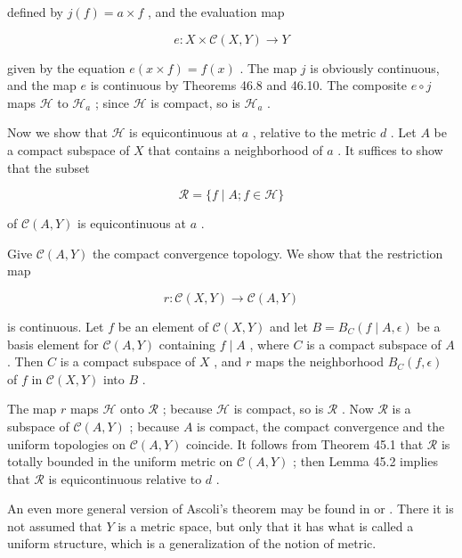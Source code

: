 defined by \(j\left( f\right)  = a \times  f\) , and the evaluation map

\[
e : X \times  \mathcal{C}\left( {X,Y}\right)  \rightarrow  Y
\]

given by the equation \(e\left( {x \times  f}\right)  = f\left( x\right)\) . The map \(j\) is obviously continuous, and the map \(e\) is continuous by Theorems 46.8 and 46.10. The composite \(e \circ  j\) maps \(\mathcal{H}\) to \({\mathcal{H}}_{a}\) ; since \(\mathcal{H}\) is compact, so is \({\mathcal{H}}_{a}\) .

Now we show that \(\mathcal{H}\) is equicontinuous at \(a\) , relative to the metric \(d\) . Let \(A\) be a compact subspace of \(X\) that contains a neighborhood of \(a\) . It suffices to show that the subset

\[
\mathcal{R} = \{ f \mid  A;f \in  \mathcal{H}\}
\]

of \(\mathcal{C}\left( {A,Y}\right)\) is equicontinuous at \(a\) .

Give \(\mathcal{C}\left( {A,Y}\right)\) the compact convergence topology. We show that the restriction map

\[
r : \mathcal{C}\left( {X,Y}\right)  \rightarrow  \mathcal{C}\left( {A,Y}\right)
\]

is continuous. Let \(f\) be an element of \(\mathcal{C}\left( {X,Y}\right)\) and let \(B = {B}_{C}\left( {f \mid  A,\epsilon }\right)\) be a basis element for \(\mathcal{C}\left( {A,Y}\right)\) containing \(f \mid  A\) , where \(C\) is a compact subspace of \(A\) . Then \(C\) is a compact subspace of \(X\) , and \(r\) maps the neighborhood \({B}_{C}\left( {f,\epsilon }\right)\) of \(f\) in \(\mathcal{C}\left( {X,Y}\right)\) into \(B\) .

The map \(r\) maps \(\mathcal{H}\) onto \(\mathcal{R}\) ; because \(\mathcal{H}\) is compact, so is \(\mathcal{R}\) . Now \(\mathcal{R}\) is a subspace of \(\mathcal{C}\left( {A,Y}\right)\) ; because \(A\) is compact, the compact convergence and the uniform topologies on \(\mathcal{C}\left( {A,Y}\right)\) coincide. It follows from Theorem 45.1 that \(\mathcal{R}\) is totally bounded in the uniform metric on \(\mathcal{C}\left( {A,Y}\right)\) ; then Lemma 45.2 implies that \(\mathcal{R}\) is equicontinuous relative to \(d\) .

An even more general version of Ascoli's theorem may be found in 		\cite{Kelley1991} or 		\cite{Willard1970}. There it is not assumed that \(Y\) is a metric space, but only that it has what is called a uniform structure, which is a generalization of the notion of metric.

